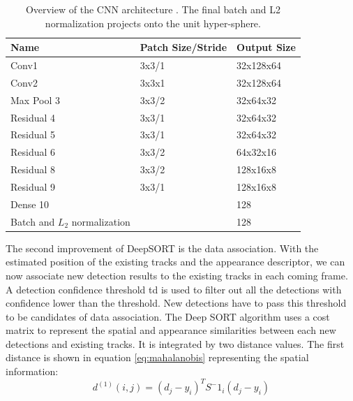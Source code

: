 \begin{table}[]
	\centering
	\label{tab:desarchitecture}
	\caption{Overview of the CNN architecture \cite{DBLP:journals/corr/WojkeBP17}. The final batch and L2 normalization projects onto the unit hyper-sphere.}
	\begin{tabular}{|l|l|l|}
		\hline
		Name                       & Patch Size/Stride & Output Size \\ \hline
		Conv1                      & 3x3/1             & 32x128x64   \\ \hline
		Conv2                      & 3x3x1             & 32x128x64   \\ \hline
		Max Pool 3                 & 3x3/2             & 32x64x32    \\ \hline
		Residual 4                 & 3x3/1             & 32x64x32    \\ \hline
		Residual 5                 & 3x3/1             & 32x64x32    \\ \hline
		Residual 6                 & 3x3/2             & 64x32x16    \\ \hline
		Residual 8                 & 3x3/2             & 128x16x8    \\ \hline
		Residual 9                 & 3x3/1             & 128x16x8    \\ \hline
		Dense 10                   &                   & 128         \\ \hline
		Batch and \(L_2\) normalization &                   & 128         \\ \hline
	\end{tabular}
	\vspace{-1cm}
\end{table}
The second improvement of DeepSORT is the data association. With the estimated position of the existing tracks and the appearance descriptor, we can now associate new detection results to the existing tracks in each coming frame. A detection confidence threshold td is used to filter out all the detections with confidence lower than the threshold. New detections have to pass this threshold to be candidates of data association. The Deep SORT algorithm uses a cost matrix to represent the spatial and appearance similarities between each new detections and existing tracks. It is integrated by two distance values. The first distance is shown in equation \ref{eq:mahalanobis} representing the spatial information:
\begin{equation}
	\label{eq:mahalanobis}
	d^{(1)}(i,j)=(d_j-y_i)^TS^-1_i(d_j-y_i)
\end{equation}
